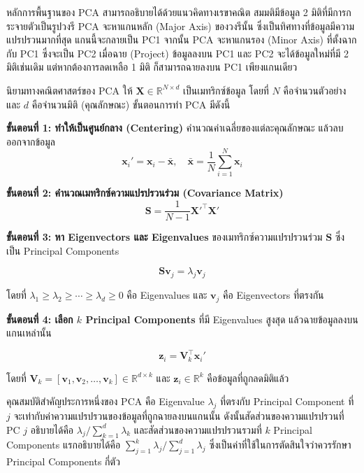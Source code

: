 หลักการพื้นฐานของ PCA สามารถอธิบายได้ด้วยแนวคิดทางเรขาคณิต สมมติมีข้อมูล 2 มิติที่มีการกระจายตัวเป็นรูปวงรี PCA จะหาแกนหลัก (Major Axis) ของวงรีนั้น ซึ่งเป็นทิศทางที่ข้อมูลมีความแปรปรวนมากที่สุด แกนนี้จะกลายเป็น PC1 จากนั้น PCA จะหาแกนรอง (Minor Axis) ที่ตั้งฉากกับ PC1 ซึ่งจะเป็น PC2 เมื่อฉาย (Project) ข้อมูลลงบน PC1 และ PC2 จะได้ข้อมูลใหม่ที่มี 2 มิติเช่นเดิม แต่หากต้องการลดเหลือ 1 มิติ ก็สามารถฉายลงบน PC1 เพียงแกนเดียว

\begin{myBox}[]{นิยามทางคณิตศาสตร์ของ PCA}{}
ให้ $\mathbf{X} \in \mathbb{R}^{N \times d}$ เป็นเมทริกซ์ข้อมูล โดยที่ $N$ คือจำนวนตัวอย่าง และ $d$ คือจำนวนมิติ (คุณลักษณะ) ขั้นตอนการทำ PCA มีดังนี้

\textbf{ขั้นตอนที่ 1: ทำให้เป็นศูนย์กลาง (Centering)} คำนวณค่าเฉลี่ยของแต่ละคุณลักษณะ แล้วลบออกจากข้อมูล
$$\mathbf{x}_i' = \mathbf{x}_i - \bar{\mathbf{x}}, \quad \bar{\mathbf{x}} = \frac{1}{N} \sum_{i=1}^{N} \mathbf{x}_i$$

\textbf{ขั้นตอนที่ 2: คำนวณเมทริกซ์ความแปรปรวนร่วม (Covariance Matrix)}
$$\mathbf{S} = \frac{1}{N-1} \mathbf{X}'^\top \mathbf{X}'$$

\textbf{ขั้นตอนที่ 3: หา Eigenvectors และ Eigenvalues} ของเมทริกซ์ความแปรปรวนร่วม $\mathbf{S}$ ซึ่งเป็น Principal Components

$$\mathbf{S} \mathbf{v}_j = \lambda_j \mathbf{v}_j$$

โดยที่ $\lambda_1 \geq \lambda_2 \geq \cdots \geq \lambda_d \geq 0$ คือ Eigenvalues และ $\mathbf{v}_j$ คือ Eigenvectors ที่ตรงกัน

\textbf{ขั้นตอนที่ 4: เลือก $k$ Principal Components} ที่มี Eigenvalues สูงสุด แล้วฉายข้อมูลลงบนแกนเหล่านั้น

$$\mathbf{z}_i = \mathbf{V}_k^\top \mathbf{x}_i'$$

โดยที่ $\mathbf{V}_k = [\mathbf{v}_1, \mathbf{v}_2, \ldots, \mathbf{v}_k] \in \mathbb{R}^{d \times k}$ และ $\mathbf{z}_i \in \mathbb{R}^k$ คือข้อมูลที่ถูกลดมิติแล้ว
\end{myBox}

คุณสมบัติสำคัญประการหนึ่งของ PCA คือ Eigenvalue $\lambda_j$ ที่ตรงกับ Principal Component ที่ $j$ จะเท่ากับค่าความแปรปรวนของข้อมูลที่ถูกฉายลงบนแกนนั้น ดังนั้นสัดส่วนของความแปรปรวนที่ PC $j$ อธิบายได้คือ $\lambda_j / \sum_{k=1}^{d} \lambda_k$ และสัดส่วนของความแปรปรวนรวมที่ $k$ Principal Components แรกอธิบายได้คือ $\sum_{j=1}^{k} \lambda_j / \sum_{j=1}^{d} \lambda_j$ ซึ่งเป็นค่าที่ใช้ในการตัดสินใจว่าควรรักษา Principal Components กี่ตัว

